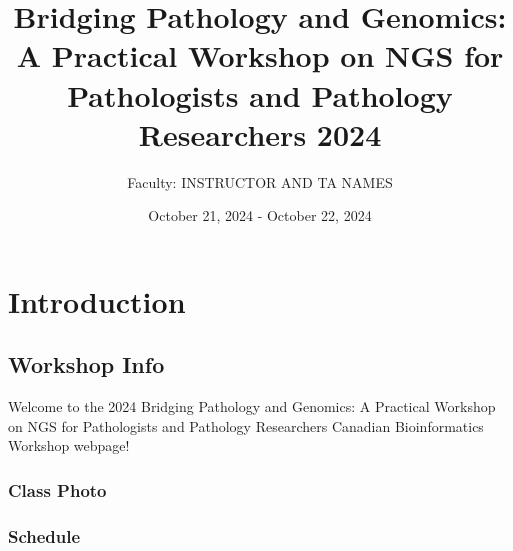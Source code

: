 \documentclass[
]{book}
\title{Bridging Pathology and Genomics: A Practical Workshop on NGS for Pathologists and Pathology Researchers 2024}
\author{Faculty: INSTRUCTOR AND TA NAMES}
\date{October 21, 2024 - October 22, 2024}
\begin{document}
\maketitle

{
\setcounter{tocdepth}{1}
\tableofcontents
}
\part{Introduction}\label{part-introduction}

\chapter{Workshop Info}\label{workshop-info}

Welcome to the 2024 Bridging Pathology and Genomics: A Practical Workshop on NGS for Pathologists and Pathology Researchers Canadian Bioinformatics Workshop webpage!

\section{Class Photo}\label{class-photo}

\section{Schedule}\label{schedule}
\end{document}
